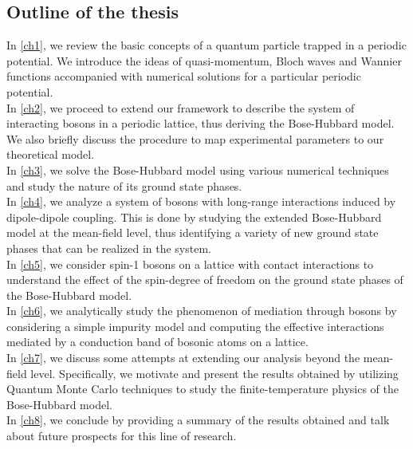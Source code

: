 \subsection*{Outline of the thesis}

In \autoref{ch1}, we review the basic concepts of a quantum particle trapped in a periodic potential. We introduce the ideas of quasi-momentum, Bloch waves and Wannier functions accompanied with numerical solutions for a particular periodic potential.
\\

In \autoref{ch2}, we proceed to extend our framework to describe the system of interacting bosons in a periodic lattice, thus deriving the Bose-Hubbard model. We also briefly discuss the procedure to map experimental parameters to our theoretical model.
\\

In \autoref{ch3}, we solve the Bose-Hubbard model using various numerical techniques and study the nature of its ground state phases.
\\

In \autoref{ch4}, we analyze a system of bosons with long-range interactions induced by dipole-dipole coupling. This is done by studying the extended Bose-Hubbard model at the mean-field level, thus identifying a variety of new ground state phases that can be realized in the system.
\\

In \autoref{ch5}, we consider spin-1 bosons on a lattice with contact interactions to understand the effect of the spin-degree of freedom on the ground state phases of the Bose-Hubbard model.
\\

In \autoref{ch6}, we analytically study the phenomenon of mediation through bosons by considering a simple impurity model and computing the effective interactions mediated by a conduction band of bosonic atoms on a lattice.
\\

In \autoref{ch7}, we discuss some attempts at extending our analysis beyond the mean-field level. Specifically, we motivate and present the results obtained by utilizing Quantum Monte Carlo techniques to study the finite-temperature physics of the Bose-Hubbard model.
\\

In \autoref{ch8}, we conclude by providing a summary of the results obtained and talk about future prospects for this line of research. 